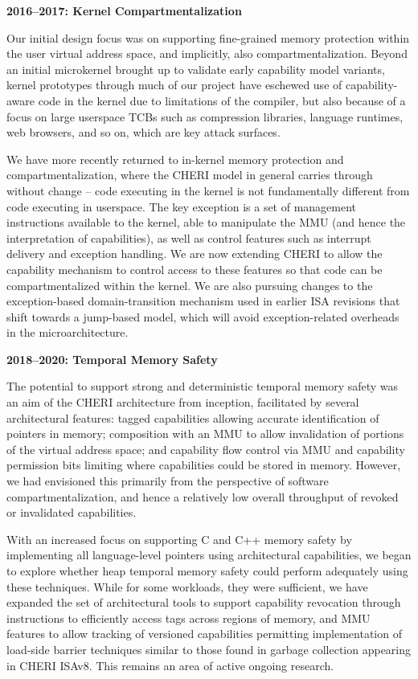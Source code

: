 \medskip
\noindent
\textbf{2016--2017: Kernel Compartmentalization}

\smallskip
\noindent
Our initial design focus was on supporting fine-grained memory protection
within the user virtual address space, and implicitly, also
compartmentalization.
Beyond an initial microkernel brought up to validate early capability model
variants, kernel prototypes through much of our project have eschewed use of
capability-aware code in the kernel due to limitations of the compiler, but
also because of a focus on large userspace TCBs such as compression libraries,
language runtimes, web browsers, and so on, which are key attack surfaces.

We have more recently returned to in-kernel memory protection and
compartmentalization, where the CHERI model in general carries through without
change -- code executing in the kernel is not fundamentally different from
code executing in userspace.
The key exception is a set of management instructions available to the kernel,
able to manipulate the MMU (and hence the interpretation of capabilities), as
well as control features such as interrupt delivery and exception handling.
We are now extending CHERI to allow the capability mechanism to control access
to these features so that code can be compartmentalized within the kernel.
We are also pursuing changes to the exception-based domain-transition
mechanism used in earlier ISA revisions that shift towards a jump-based model,
which will avoid exception-related overheads in the microarchitecture.

\medskip
\noindent
\textbf{2018--2020: Temporal Memory Safety}

The potential to support strong and deterministic temporal memory safety was
an aim of the CHERI architecture from inception, facilitated by several
architectural features: tagged capabilities allowing accurate identification
of pointers in memory; composition with an MMU to allow invalidation of
portions of the virtual address space; and capability flow control via MMU
and capability permission bits limiting where capabilities could be stored in
memory.
However, we had envisioned this primarily from the perspective of software
compartmentalization, and hence a relatively low overall throughput of
revoked or invalidated capabilities.

With an increased focus on supporting C and C++ memory safety by implementing
all language-level pointers using architectural capabilities, we began to
explore whether heap temporal memory safety could perform adequately using
these techniques.
While for some workloads, they were sufficient, we have expanded the set of
architectural tools to support capability revocation through instructions to
efficiently access tags across regions of memory, and MMU features to allow
tracking of versioned capabilities permitting implementation of load-side
barrier techniques similar to those found in garbage collection appearing in
CHERI ISAv8.
This remains an area of active ongoing research.

